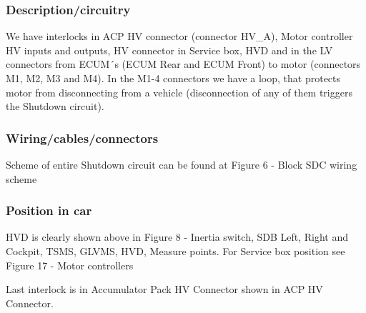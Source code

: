 \subsubsection{Description/circuitry}
\iffalse Describe the concept and circuitry of the Shutdown System Interlocks.
Note: Interlocks are circuits used to open the shutdown circuit if a connector is disconnected or enclosure is opened.  This is not the entire shutdown circuit.\fi

We have interlocks in ACP HV connector (connector HV\_A), Motor controller HV inputs and outputs, HV connector in Service box, HVD and in the LV connectors from ECUM´s (ECUM Rear and ECUM Front) to motor (connectors M1, M2, M3 and M4). In the M1-4 connectors we have a loop, that protects motor from disconnecting from a vehicle (disconnection of any of them triggers the Shutdown circuit).

\subsubsection{Wiring/cables/connectors}

Scheme of entire Shutdown circuit can be found at Figure 6 - Block SDC wiring scheme
\subsubsection{Position in car}
HVD is clearly shown above in Figure 8 - Inertia switch, SDB Left, Right and Cockpit, TSMS, GLVMS, HVD, Measure points. For Service box position see Figure 17 - Motor controllers

Last interlock is in Accumulator Pack HV Connector shown in ACP HV Connector.